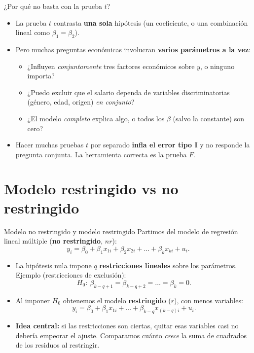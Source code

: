 \documentclass{beamer}
\begin{document}
\begin{frame}{¿Por qué no basta con la prueba $t$?}
\begin{itemize}
    \item La prueba $t$ contrasta \textbf{una sola} hipótesis (un coeficiente, o una combinación lineal como $\beta_1=\beta_2$).
    \pause
    \item Pero muchas preguntas económicas involucran \textbf{varios parámetros a la vez}:
    \begin{itemize}
        \item ¿Influyen \emph{conjuntamente} tres factores económicos sobre $y$, o ninguno importa?
        \item ¿Puedo excluir que el salario dependa de variables discriminatorias (género, edad, origen) \emph{en conjunto}?
        \item ¿El modelo \emph{completo} explica algo, o todos los $\beta$ (salvo la constante) son cero?
    \end{itemize}
    \pause
    \item Hacer muchas pruebas $t$ por separado \textbf{infla el error tipo I} y no responde la pregunta conjunta. La herramienta correcta es la prueba $F$.
\end{itemize}
\end{frame}

\section{Modelo restringido vs no restringido}

\begin{frame}{Modelo no restringido y modelo restringido}
Partimos del modelo de regresión lineal múltiple (\textbf{no restringido}, $nr$):
\[
    y_i = \beta_0 + \beta_1 x_{1i} + \beta_2 x_{2i} + \dots + \beta_k x_{ki} + u_i .
\]
\begin{itemize}
    \item La hipótesis nula impone $q$ \textbf{restricciones lineales} sobre los parámetros. Ejemplo (restricciones de exclusión):
    \[
        H_0:\ \beta_{k-q+1} = \beta_{k-q+2} = \dots = \beta_k = 0 .
    \]
    \pause
    \item Al imponer $H_0$ obtenemos el modelo \textbf{restringido} ($r$), con menos variables:
    \[
        y_i = \beta_0 + \beta_1 x_{1i} + \dots + \beta_{k-q} x_{(k-q)i} + u_i .
    \]
    \pause
    \item \textbf{Idea central:} si las restricciones son ciertas, quitar esas variables casi no debería empeorar el ajuste. Comparamos cuánto \emph{crece} la suma de cuadrados de los residuos al restringir.
\end{itemize}
\end{frame}
\end{document}
